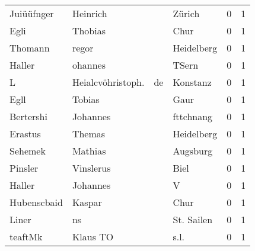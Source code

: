 \begin{center}
\begin{tiny}
\begin{longtabu}{llllrr}
               Juiüüfnger &                           Heinrich &             &                                      Zürich &          0 &         1 \\
                     Egli &                            Thobias &             &                                        Chur &          0 &         1 \\
                  Thomann &                              regor &             &                                  Heidelberg &          0 &         1 \\
                   Haller &                            ohannes &             &                                       TSern &          0 &         1 \\
                        L &                  Heialcvöhristoph. &          de &                                    Konstanz &          0 &         1 \\
                     Egll &                             Tobias &             &                                        Gaur &          0 &         1 \\
                Bertershi &                           Johannes &             &                                   fttchnang &          0 &         1 \\
                  Erastus &                             Themas &             &                                  Heidelberg &          0 &         1 \\
                  Sehemek &                            Mathias &             &                                    Augsburg &          0 &         1 \\
                  Pinsler &                          Vinslerus &             &                                        Biel &          0 &         1 \\
                   Haller &                           Johannes &             &                                           V &          0 &         1 \\
              Hubenscbaid &                             Kaspar &             &                                        Chur &          0 &         1 \\
                    Liner &                                 ns &             &                                  St. Sailen &          0 &         1 \\
                  teaftMk &                           Klaus TO &             &                                        s.l. &          0 &         1 \\

\end{longtabu}
\end{tiny}
\end{center}
